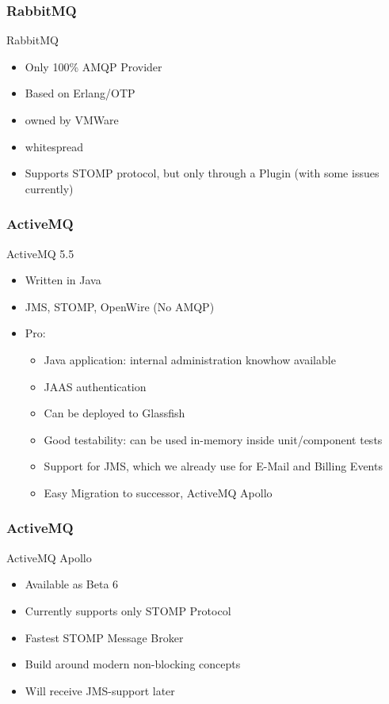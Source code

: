 \documentclass[serif,mathserif]{beamer}
\begin{document}
\begin{frame}
\frametitle{RabbitMQ}
RabbitMQ
\begin{itemize}
  \item Only 100\% AMQP Provider
  \item Based on Erlang/OTP
  \item owned by VMWare
  \item whitespread
  \item Supports STOMP protocol, but only through a Plugin (with some issues currently)
\end{itemize}
\end{frame}

\begin{frame}
\frametitle{ActiveMQ}
ActiveMQ 5.5
\begin{itemize}
  \item Written in Java
  \item JMS, STOMP, OpenWire (No AMQP) 
  \item Pro:
  \begin{itemize}
    \item Java application: internal administration knowhow available
    \item JAAS authentication
    \item Can be deployed to Glassfish
    \item Good testability: can be used in-memory inside unit/component tests
    \item Support for JMS, which we already use for E-Mail and Billing Events
	\item Easy Migration to successor, ActiveMQ Apollo
  \end{itemize}
\end{itemize}
\end{frame}

\begin{frame}
\frametitle{ActiveMQ}
ActiveMQ Apollo
\begin{itemize}
  \item Available as Beta 6
  \item Currently supports only STOMP Protocol
  \item Fastest STOMP Message Broker
  \item Build around modern non-blocking concepts
  \item Will receive JMS-support later
\end{itemize}
\end{frame}
\end{document}
